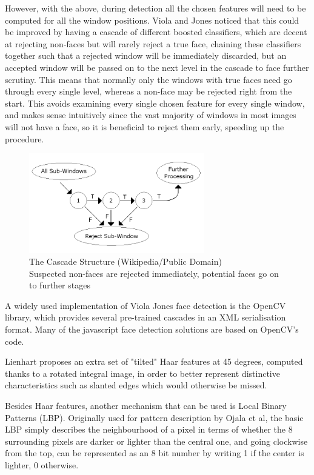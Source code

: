 \documentclass[a4paper]{article}
\begin{document}
However, with the above, during detection all the chosen features will need to be computed for all the window positions. Viola and Jones noticed that this could be improved by having a cascade of different boosted classifiers, which are decent at rejecting non-faces but will rarely reject a true face, chaining these classifiers together such that a rejected window will be immediately discarded, but an accepted window will be passed on to the next level in the cascade to face further scrutiny. This means that normally only the windows with true faces need go through every single level, whereas a non-face may be rejected right from the start. This avoids examining every single chosen feature for every single window, and makes sense intuitively since the vast majority of windows in most images will not have a face, so it is beneficial to reject them early, speeding up the procedure.

\begin{figure}
    \centering
    \includegraphics[width=3.0in]{cascade.png}
    \caption{The Cascade Structure (Wikipedia/Public Domain)\\ Suspected non-faces are rejected immediately, potential faces go on to further stages}
    \label{cascade}
\end{figure}

A widely used implementation of Viola Jones face detection is the OpenCV library, which provides several pre-trained cascades in an XML serialisation format. Many of the javascript face detection solutions are based on OpenCV's code.

Lienhart \cite{LienhartMaydt02} proposes an extra set of "tilted" Haar features at 45 degrees, computed thanks to a rotated integral image, in order to better represent distinctive characteristics such as slanted edges which would otherwise be missed. 

Besides Haar features, another mechanism that can be used is Local Binary Patterns (LBP). Originally used for pattern description by Ojala et al, the basic LBP simply describes the neighbourhood of a pixel in terms of whether the 8 surrounding pixels are darker or lighter than the central one, and going clockwise from the top, can be represented as an 8 bit number by writing 1 if the center is lighter, 0 otherwise.
\end{document}
